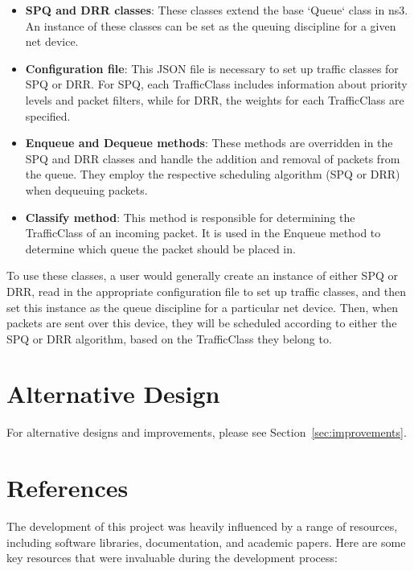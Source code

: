 \documentclass{article}
\begin{document}
\begin{itemize}
    \item \textbf{SPQ and DRR classes}: These classes extend the base `Queue` class in ns3. An instance of these classes can be set as the queuing discipline for a given net device. 

    \item \textbf{Configuration file}: This JSON file is necessary to set up traffic classes for SPQ or DRR. For SPQ, each TrafficClass includes information about priority levels and packet filters, while for DRR, the weights for each TrafficClass are specified.

    \item \textbf{Enqueue and Dequeue methods}: These methods are overridden in the SPQ and DRR classes and handle the addition and removal of packets from the queue. They employ the respective scheduling algorithm (SPQ or DRR) when dequeuing packets.

    \item \textbf{Classify method}: This method is responsible for determining the TrafficClass of an incoming packet. It is used in the Enqueue method to determine which queue the packet should be placed in.
\end{itemize}

To use these classes, a user would generally create an instance of either SPQ or DRR, read in the appropriate configuration file to set up traffic classes, and then set this instance as the queue discipline for a particular net device. Then, when packets are sent over this device, they will be scheduled according to either the SPQ or DRR algorithm, based on the TrafficClass they belong to.

\section{Alternative Design}

For alternative designs and improvements, please see Section~\ref{sec:improvements}.

\section{References}

The development of this project was heavily influenced by a range of resources, including software libraries, documentation, and academic papers. Here are some key resources that were invaluable during the development process:
\end{document}

